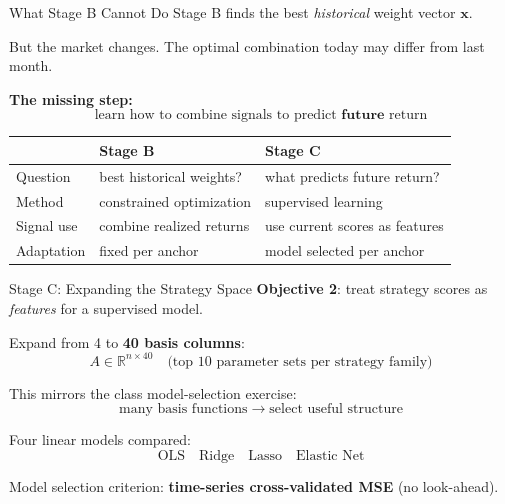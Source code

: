 \documentclass[aspectratio=169]{beamer}
\begin{document}
\begin{frame}{What Stage B Cannot Do}
  Stage B finds the best \emph{historical} weight vector \(\mathbf{x}\).

  \vspace{0.6em}
  But the market changes. The optimal combination today may differ from last month.

  \vspace{0.6em}
  \textbf{The missing step:}
  \[
    \text{learn how to combine signals to predict } \textbf{future} \text{ return}
  \]

  \vspace{0.6em}
  \begin{tabular}{lll}
    \toprule
    & Stage B & Stage C \\
    \midrule
    Question    & best historical weights? & what predicts future return? \\
    Method      & constrained optimization & supervised learning \\
    Signal use  & combine realized returns & use current scores as features \\
    Adaptation  & fixed per anchor         & model selected per anchor \\
    \bottomrule
  \end{tabular}
\end{frame}

\begin{frame}{Stage C: Expanding the Strategy Space}
  \textbf{Objective 2}: treat strategy scores as \emph{features} for a supervised model.

  \vspace{0.5em}
  Expand from 4 to \textbf{40 basis columns}:
  \[
    A \in \mathbb{R}^{n \times 40}
    \quad \text{(top 10 parameter sets per strategy family)}
  \]

  \vspace{0.4em}
  This mirrors the class model-selection exercise:
  \[
    \text{many basis functions} \;\longrightarrow\; \text{select useful structure}
  \]

  \vspace{0.4em}
  Four linear models compared:
  \[
    \text{OLS} \quad \text{Ridge} \quad \text{Lasso} \quad \text{Elastic Net}
  \]

  \vspace{0.4em}
  Model selection criterion: \textbf{time-series cross-validated MSE} (no look-ahead).
\end{frame}
\end{document}
